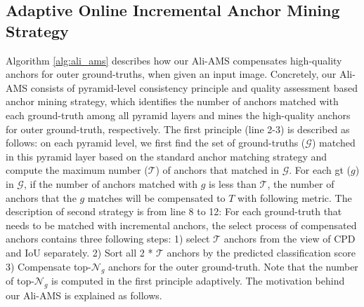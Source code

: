 \documentclass[10pt,twocolumn,letterpaper]{article}
\begin{document}
\subsection{Adaptive Online Incremental Anchor Mining Strategy}
\label{sec:Ali-AMS}
Algorithm \ref{alg:ali_ams} describes how our Ali-AMS compensates high-quality anchors for outer ground-truths, when given an input image. Concretely, our Ali-AMS consists of pyramid-level consistency principle and quality assessment based anchor mining strategy, which identifies the number of anchors matched with each ground-truth among all pyramid layers and mines the high-quality anchors for outer ground-truth, respectively. The first principle (line 2-3) is described as follows: on each pyramid level, we first find the set of ground-truths ($\mathcal{G}$) matched in this pyramid layer based on the standard anchor matching strategy \cite{lin2017focal} and compute the maximum number ($\mathcal{T}$) of anchors that matched in $\mathcal{G}$. For each gt ($g$) in $\mathcal{G}$, if the number of anchors matched with $g$ is less than $\mathcal{T}$, the number of anchors that the $g$ matches will be  compensated to $T$ with following metric.  The description of  second strategy is from line 8 to 12: For each ground-truth that needs to be matched with incremental anchors, the select process of compensated anchors contains three following steps: 1) select $\mathcal{T}$ anchors from the view of CPD and IoU separately. 2) Sort all 2 * $\mathcal{T}$ anchors by the predicted classification score 3) Compensate top-$\mathcal{N}_{g}$ anchors for the outer ground-truth. Note that the number of top-$\mathcal{N}_{g}$ is computed in the first principle adaptively. The motivation behind our Ali-AMS is explained as follows.
\end{document}
